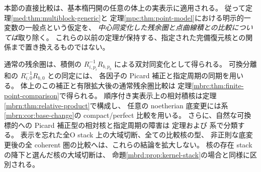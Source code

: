 \begin{remark}
\label{mbnp:rem:scope}
本節の直接比較は、基本楕円開の任意の体上の実表示に適用される。
従って定理\ref{med:thm:multiblock-generic}と
定理\ref{mpc:thm:point-model}における明示的一変数の一般点という仮定を、
\emph{中心同変化した残余圏と点曲線積との比較については}取り除く。
これらの以前の定理が保持する、指定された完備復元核との関係まで置き換えるものではない。

通常の残余圏は、積側の
$R_{i,p_i}^{-1}R_{b,p_b}$ による双対同変化として得られる。
可換分離和の $R_{i,0}^{-1}R_{b,0}$ との同定には、
各因子の Picard 補正と指定周期の同期を用いる。
体上のこの補正と有限拡大後の通常残余圏比較は
定理\ref{mbrc:thm:finite-point-comparison}で得られる。
順序付き実表示上の相対積核は定理\ref{mbrn:thm:relative-product}で構成し、
任意の noetherian 底変更には系\ref{mbrn:cor:base-change}の
compact/perfect 比較を用いる。
さらに、自然な可換標的への Picard 補正型の相対核と指定周期の障害は
定理および
系で分類する。
表示を忘れた全O stack 上の大域切断、全ての比較核の型、
非正則な底変更後の全 coherent 圏の比較へは、これらの結論を拡大しない。
核の存在 stack の降下と選んだ核の大域切断は、
命題\ref{mbrd:prop:kernel-stack}の場合と同様に区別される。
\end{remark}
